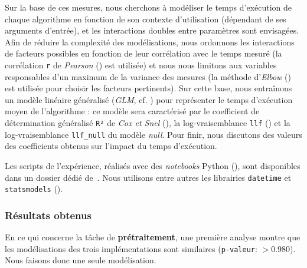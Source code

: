 			Sur la base de ces mesures, nous cherchons à modéliser le temps d'exécution de chaque algorithme en fonction de son contexte d'utilisation (dépendant de ses arguments d'entrée), et les interactions doubles entre paramètres sont envisagées.
			Afin de réduire la complexité des modélisations, nous ordonnons les interactions de facteurs possibles en fonction de leur corrélation avec le temps mesuré (la corrélation \texttt{r} de \textit{Pearson} (\cite{kirch:2008:pearson-correlation-coefficient}) est utilisée) et nous nous limitons aux variables responsables d'un maximum de la variance des mesures (la méthode d'\textit{Elbow} (\cite{thorndike:1953:who-belongs-family}) est utilisée pour choisir les facteurs pertinents).
			Sur cette base, nous entraînons un modèle linéaire généralisé (\textit{GLM}, cf. \cite{nelder-wedderburn:1972:generalized-linear-models}) pour représenter le temps d'exécution moyen de l'algorithme : ce modèle sera caractérisé par le coefficient de détermination généralisé \texttt{R²} de \textit{Cox et Snel} (\cite{diamond-etal:1990:analysis-binary-data}), la log-vraisemblance \texttt{llf} (\cite{edwards:1992:likelihood}) et la log-vraisemblance \texttt{llf\_null} du modèle \textit{null}.
			Pour finir, nous discutons des valeurs des coefficients obtenus sur l'impact du temps d'exécution.
			
			\begin{leftBarInformation}
				Les scripts de l'expérience, réalisés avec des \textit{notebooks} Python (\cite{van-rossum-drake:2009:python-reference-manual}), sont disponibles dans un dossier dédié de~\cite{schild:2021:cognitivefactory-interactiveclusteringcomparativestudy}.
				Nous utilisons entre autres les librairies \texttt{datetime} et \texttt{statsmodels} (\cite{seabold-perktold:2010:statsmodels-econometric-statistical}).
			\end{leftBarInformation}

		\subsubsection{Résultats obtenus}
				
			
			En ce qui concerne la tâche de \textbf{prétraitement}, une première analyse montre que les modélisations des trois implémentations sont similaires (\texttt{p-valeur}: $> 0.980$). Nous faisons donc une seule modélisation.
			
